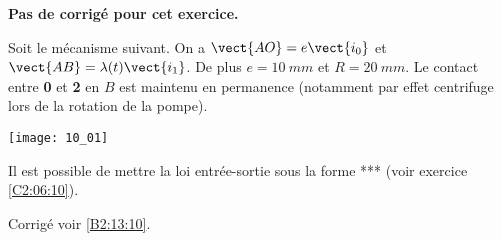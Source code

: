 \normaltrue \difficilefalse \tdifficilefalse
\correctionfalse


\setcounter{numques}{0}
\ifcorrection
\else
\textbf{Pas de corrigé pour cet exercice.}
\fi

\ifprof
\else
Soit le mécanisme suivant. On a $\vect{AO}=e\vect{i_0}$ et $\vect{AB}=\lambda(t)\vect{i_1}$. De plus $e=\SI{10}{mm}$ et $R=\SI{20}{mm}$. Le contact entre \textbf{0} et \textbf{2} en $B$ est maintenu en permanence (notamment par effet centrifuge lors de la rotation de la pompe).
\begin{center}
\texttt{[image: 10\_01]}
\end{center}
\fi

Il est possible de mettre la loi entrée-sortie sous la forme *** (voir exercice \ref{C2:06:10}).

\ifprof
\else
\fi

\ifprof
\else
\fi


\ifprof
\else
\begin{flushright}
\footnotesize{Corrigé  voir \ref{B2:13:10}.}
\end{flushright}%
\fi